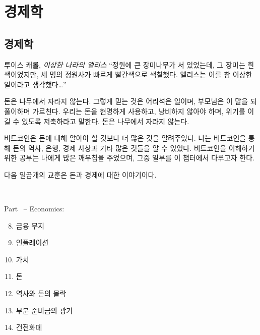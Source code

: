 \part{경제학}
\label{ch:economics}
\chapter*{경제학}

\begin{chapquote}{루이스 캐롤, \textit{이상한 나라의 앨리스}}
	\enquote{정원에 큰 장미나무가 서 있었는데, 그 장미는 흰색이었지만, 세 명의 정원사가 빠르게 빨간색으로 색칠했다.
		앨리스는 이를 참 이상한 일이라고 생각했다\ldots}
\end{chapquote}

돈은 나무에서 자라지 않는다. 
그렇게 믿는 것은 어리석은 일이며, 부모님은 이 말을 되풀이하며 가르친다.
우리는 돈을 현명하게 사용하고, 낭비하지 않아야 하며, 위기를 이길 수 있도록 저축하라고 말한다. 
돈은 나무에서 자라지 않는다.

비트코인은 돈에 대해 알아야 할 것보다 더 많은 것을 알려주었다. 
나는 비트코인을 통해 돈의 역사, 은행, 경제 사상과 기타 많은 것들을 알 수 있었다. 
비트코인을 이해하기 위한 공부는 나에게 많은 깨우침을 주었으며, 그중 일부를 이 챕터에서 다루고자 한다.

다음 일곱개의 교훈은 돈과 경제에 대한 이야기이다.

~

\begin{samepage}
	Part~\ref{ch:economics} -- Economics:
	
	\begin{enumerate}
		\setcounter{enumi}{7}
		\item 금융 무지
		\item 인플레이션
		\item 가치
		\item 돈
		\item 역사와 돈의 몰락
		\item 부분 준비금의 광기
		\item 건전화폐
	\end{enumerate}
\end{samepage}

